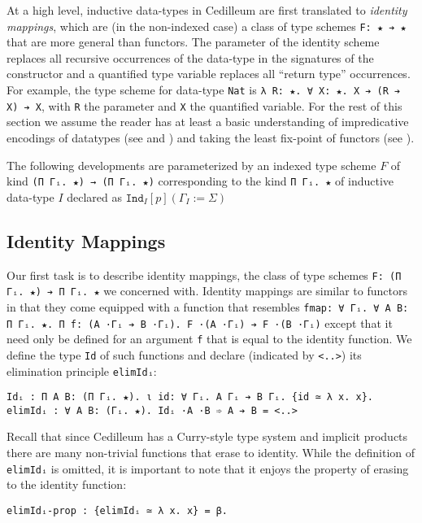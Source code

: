 \documentclass{article}
\newcommand{\indast}[4]{\texttt{Ind}_{#1} [#2] (#3 := #4)}
\begin{document}
At a high level, inductive data-types in Cedilleum are first translated to
\textit{identity mappings}, which are (in the non-indexed case) a class of type
schemes \verb;F: ★ ➔ ★; that are more general than functors. The parameter of
the identity scheme replaces all recursive occurrences of the data-type in the
signatures of the constructor and a quantified type variable replaces all
``return type'' occurrences. For example, the type scheme for data-type
\verb;Nat; is \verb;λ R: ★. ∀ X: ★. X ➔ (R ➔ X) ➔ X;, with \verb;R; the
parameter and \verb;X; the quantified variable. For the rest of this
section we assume the reader has at least a basic understanding of impredicative
encodings of datatypes (see \cite{PP89_Inductive-Types-CC} and
\cite{Wa90_Rec-Types-For-Free}) and taking the least fix-point of functors (see
\cite{MFP91_Bananas-Lenses-Envelopes-Barbed-Wire}).

The following developments are parameterized by an indexed type scheme $F$ of
kind \verb;(Π Γᵢ. ★) → (Π Γᵢ. ★); corresponding to the kind
\verb;Π Γᵢ. ★; of inductive data-type $I$ declared as $\indast{I}{p}{\Gamma_I}{\Sigma}$

\subsection{Identity Mappings}
Our first task is to describe identity mappings, the class of type schemes
\verb;F: (Π Γᵢ. ★) ➔ Π Γᵢ. ★; we concerned with. Identity mappings are similar to functors
in that they come equipped with a function that resembles
\verb;fmap: ∀ Γᵢ. ∀ A B: Π Γᵢ. ★. Π f: (A ·Γᵢ ➔ B ·Γᵢ). F ·(A ·Γᵢ) ➔ F ·(B ·Γᵢ);
except that it need only be defined for an argument \verb;f; that is equal to the
identity function. We define the type \verb;Id; of such functions and declare
(indicated by \verb;<..>;) its elimination principle \verb;elimIdᵢ;:

\begin{verbatim}
Idᵢ : Π A B: (Π Γᵢ. ★). ι id: ∀ Γᵢ. A Γᵢ ➔ B Γᵢ. {id ≃ λ x. x}.
elimIdᵢ : ∀ A B: (Γᵢ. ★). Idᵢ ·A ·B ➾ A ➔ B = <..>
\end{verbatim}

Recall that since Cedilleum has a Curry-style type system and implicit
products there are many non-trivial functions that erase to identity.
While the definition of \verb;elimIdᵢ; is omitted, it is important to note that
it enjoys the property of erasing to the identity function:
\begin{verbatim}
elimIdᵢ-prop : {elimIdᵢ ≃ λ x. x} = β.
\end{verbatim}
\end{document}
